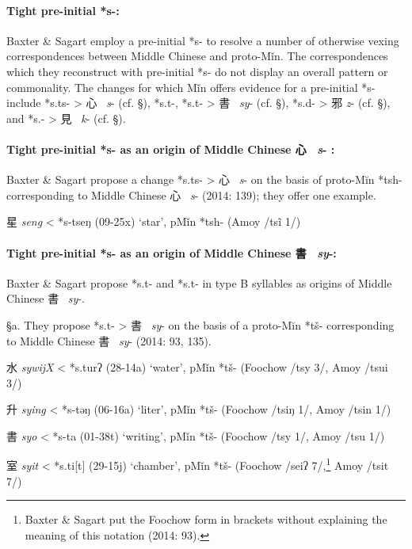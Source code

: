 \paragraph{Tight pre-initial *s-:} Baxter \&
Sagart employ a pre-initial *s- to resolve a number of otherwise vexing
correspondences between Middle Chinese and proto-Mǐn. The
correspondences which they reconstruct with pre-initial *s- do not
display an overall pattern or commonality. The changes for which Mǐn
offers evidence for a pre-initial *s- include *s.ts{}{}- \textgreater{}
心~ \emph{s}- (cf. §), *s.t-, *s.t{}- \textgreater{} 書~ \emph{sy}- (cf.
§), *s.d- \textgreater{} 邪  \emph{z}- (cf. §), and *s.{}- \textgreater{}
見~ \emph{k}- (cf. §).

\paragraph{Tight pre-initial *s- as an origin
of Middle Chinese 心~ \emph{s}- :}
Baxter \& Sagart propose a change *s.ts{}{}- \textgreater{} 心~ \emph{s}-
on the basis of proto-Mĭn *tsh- corresponding to Middle Chinese
心~ \emph{s}- (2014: 139); they offer one example.

\begin{description} \item
星 \emph{seng} \textless{} *s-ts{}{}eŋ (09-25x) `star', pMǐn *tsh- (Amoy
/ts{}ĩ 1/)
\end{description}

\paragraph{Tight pre-initial *s- as an origin
of Middle Chinese 書~ \emph{sy}-:} Baxter \& Sagart
propose *s.t- and *s.t{}- in type B syllables as origins of Middle
Chinese 書~ \emph{sy}-.

§a. They propose *s.t- \textgreater{} 書~ \emph{sy}- on the basis of a
proto-Mĭn *tš- corresponding to Middle Chinese 書~ \emph{sy}- (2014: 93, 135).

\begin{description} \item
水  \emph{sywijX} \textless{} *s.turʔ (28-14a) `water', pMǐn *tš-
(Foochow /tsy 3/, Amoy /tsui 3/)
\item
升  \emph{sying} \textless{} *s-təŋ (06-16a) `liter', pMǐn *tš- (Foochow
/tsiŋ 1/, Amoy /tsin 1/)
\item
書  \emph{syo} \textless{} *s-ta (01-38t) `writing', pMǐn *tš- (Foochow
/tsy 1/, Amoy /tsu 1/)
\item
室  \emph{syit} \textless{} *s.ti{[}t] (29-15j) `chamber', pMǐn *tš-
(Foochow /seiʔ 7/,\footnote{Baxter \& Sagart put the Foochow form in
  brackets without explaining the meaning of this notation (2014: 93).}
Amoy /tsit 7/)
\end{description}

